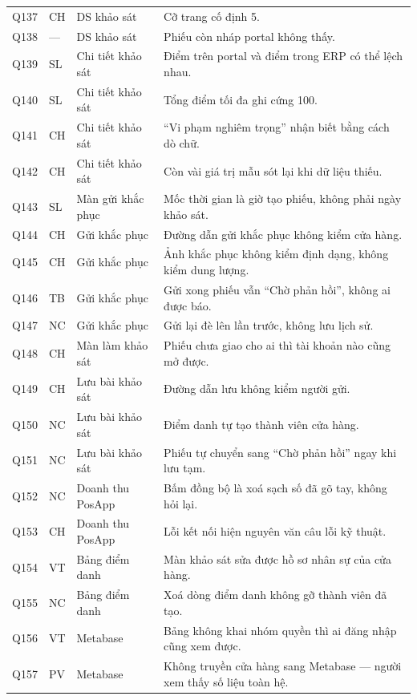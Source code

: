 {\begin{longtable}{@{}L{0.8cm}L{1.1cm}L{3.4cm}L{9.4cm}@{}}
Q137 & CH & DS khảo sát & Cỡ trang cố định 5. \\
Q138 & --- & DS khảo sát & Phiếu còn nháp portal không thấy. \\
Q139 & SL & Chi tiết khảo sát & Điểm trên portal và điểm trong ERP có thể lệch nhau. \\
Q140 & SL & Chi tiết khảo sát & Tổng điểm tối đa ghi cứng 100. \\
Q141 & CH & Chi tiết khảo sát & ``Vi phạm nghiêm trọng'' nhận biết bằng cách dò chữ. \\
Q142 & CH & Chi tiết khảo sát & Còn vài giá trị mẫu sót lại khi dữ liệu thiếu. \\
Q143 & SL & Màn gửi khắc phục & Mốc thời gian là giờ tạo phiếu, không phải ngày khảo sát. \\
Q144 & CH & Gửi khắc phục & Đường dẫn gửi khắc phục không kiểm cửa hàng. \\
Q145 & CH & Gửi khắc phục & Ảnh khắc phục không kiểm định dạng, không kiểm dung lượng. \\
Q146 & TB & Gửi khắc phục & Gửi xong phiếu vẫn ``Chờ phản hồi'', không ai được báo. \\
Q147 & NC & Gửi khắc phục & Gửi lại đè lên lần trước, không lưu lịch sử. \\
Q148 & CH & Màn làm khảo sát & Phiếu chưa giao cho ai thì tài khoản nào cũng mở được. \\
Q149 & CH & Lưu bài khảo sát & Đường dẫn lưu không kiểm người gửi. \\
Q150 & NC & Lưu bài khảo sát & Điểm danh tự tạo thành viên cửa hàng. \\
Q151 & NC & Lưu bài khảo sát & Phiếu tự chuyển sang ``Chờ phản hồi'' ngay khi lưu tạm. \\
Q152 & NC & Doanh thu PosApp & Bấm đồng bộ là xoá sạch số đã gõ tay, không hỏi lại. \\
Q153 & CH & Doanh thu PosApp & Lỗi kết nối hiện nguyên văn câu lỗi kỹ thuật. \\
Q154 & VT & Bảng điểm danh & Màn khảo sát sửa được hồ sơ nhân sự của cửa hàng. \\
Q155 & NC & Bảng điểm danh & Xoá dòng điểm danh không gỡ thành viên đã tạo. \\
Q156 & VT & Metabase & Bảng không khai nhóm quyền thì ai đăng nhập cũng xem được. \\
Q157 & PV & Metabase & Không truyền cửa hàng sang Metabase --- người xem thấy số liệu toàn hệ. \\
\end{longtable}}

